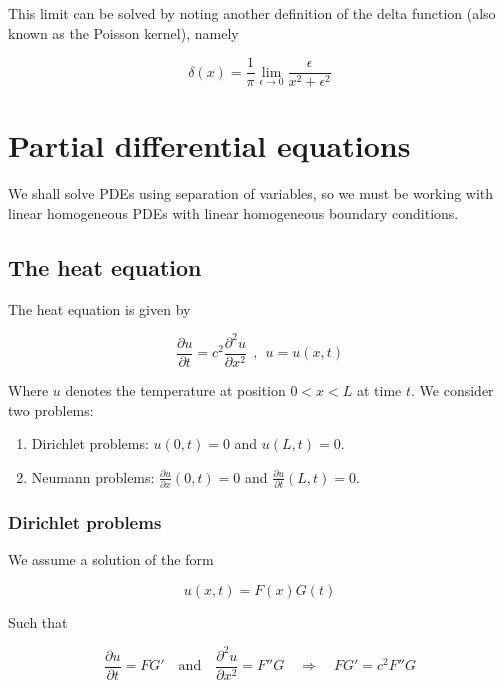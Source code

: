 \documentclass[a4paper]{article}
\begin{document}
This limit can be solved by noting another definition of the delta function (also known as the Poisson kernel), namely

\begin{equation*}
    \delta(x)=\frac{1}{\pi}\lim_{\epsilon\rightarrow 0}\frac{\epsilon}{x^2+\epsilon^2}
\end{equation*}

\section{Partial differential equations}

We shall solve PDEs using separation of variables, so we must be working with linear homogeneous PDEs with linear homogeneous boundary conditions.

\subsection{The heat equation}

The heat equation is given by

\begin{equation*}
    \frac{\partial u}{\partial t}=c^2\frac{\partial^2 u}{\partial x^2}\ \ ,\ \ u=u(x,t)
\end{equation*}

Where $u$ denotes the temperature at position $0<x<L$ at time $t$. We consider two problems:

\begin{enumerate}
    \item Dirichlet problems: $u(0, t)=0$ and $u(L, t)=0$.
    \item Neumann problems: $\frac{\partial u}{\partial x}(0, t)=0$ and $\frac{\partial u}{\partial t}(L, t)=0$.
\end{enumerate}

\subsubsection*{Dirichlet problems}

We assume a solution of the form 

\begin{equation*}
    u(x, t)=F(x)G(t)
\end{equation*}

Such that

\begin{equation*}
    \frac{\partial u}{\partial t}=FG'\quad\text{and}\quad \frac{\partial^2 u}{\partial x^2}=F''G\quad\Rightarrow\quad FG'=c^2F''G
\end{equation*}
\end{document}
